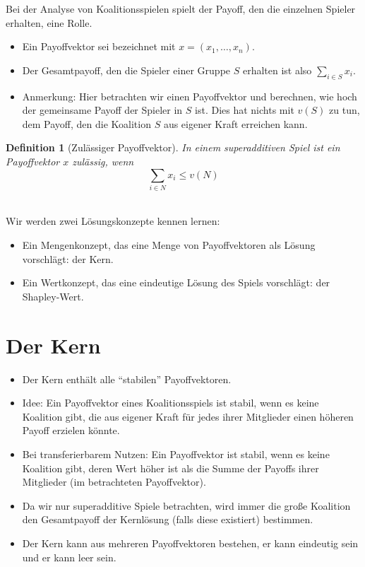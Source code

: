 \documentclass[12pt]{extreport} %
\theoremstyle{named}
\theoremstyle{itshape}
\newtheorem*{definition}{Definition}
\theoremstyle{normal}
\begin{document}
Bei der Analyse von Koalitionsspielen spielt der Payoff, den die einzelnen Spieler erhalten, eine Rolle.
\begin{itemize}
	\item Ein Payoffvektor sei bezeichnet mit $x = (x_1, \dotsc, x_n)$.
	\item Der Gesamtpayoff, den die Spieler einer Gruppe $S$ erhalten ist also $\sum_{i \in S} x_i$.
	\item Anmerkung: Hier betrachten wir einen Payoffvektor und berechnen, wie hoch der gemeinsame Payoff der Spieler in $S$ ist. Dies hat nichts mit $v(S)$ zu tun, dem Payoff, den die Koalition $S$ aus eigener Kraft erreichen kann.
\end{itemize} 

\begin{definition}[Zulässiger Payoffvektor]
	In einem superadditiven Spiel ist ein Payoffvektor $x$ zulässig, wenn
	$$ \sum_{i \in N} x_i \leq v(N) $$
\end{definition} ~\\
	
Wir werden zwei Lösungskonzepte kennen lernen:
\begin{itemize}
	\item Ein Mengenkonzept, das eine Menge von Payoffvektoren als Lösung vorschlägt: der Kern.
	\item Ein Wertkonzept, das eine eindeutige Lösung des Spiels vorschlägt: der Shapley-Wert.
\end{itemize}

\section{Der Kern} 

\begin{itemize}
	\item Der Kern enthält alle \enquote{stabilen} Payoffvektoren.
	\item Idee: Ein Payoffvektor eines Koalitionsspiels ist stabil, wenn es keine Koalition gibt, die aus eigener Kraft für jedes ihrer Mitglieder einen höheren Payoff erzielen könnte.
	\item Bei transferierbarem Nutzen: Ein Payoffvektor ist stabil, wenn es keine Koalition gibt, deren Wert höher ist als die Summe der Payoffs ihrer Mitglieder (im betrachteten Payoffvektor).
	\item Da wir nur superadditive Spiele betrachten, wird immer die große Koalition den Gesamtpayoff der Kernlösung (falls diese existiert) bestimmen.
	\item Der Kern kann aus mehreren Payoffvektoren bestehen, er kann eindeutig sein und er kann leer sein.
\end{itemize}
\end{document}
